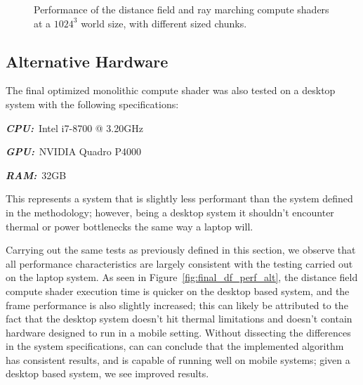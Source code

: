 \begin{figure}

    \caption{Performance of the distance field and ray marching compute shaders at a $1024^3$ world size, with
        different sized chunks.}
    \label{fig:final_df_perf}
\end{figure}

\subsection{Alternative Hardware}
The final optimized monolithic compute shader was also tested on a desktop system with the following specifications:

\begin{description}
    \item \textbf{\textit{CPU:}}~Intel i7-8700 @ 3.20GHz
    \item \textbf{\textit{GPU:}}~NVIDIA Quadro P4000
    \item \textbf{\textit{RAM:}}~32GB
\end{description}

This represents a system that is slightly less performant than the system defined in the methodology; however, being a
desktop system it shouldn't encounter thermal or power bottlenecks the same way a laptop will.

Carrying out the same tests as previously defined in this section, we observe that all performance characteristics
are largely consistent with the testing carried out on the laptop system. As seen in Figure~\ref{fig:final_df_perf_alt},
the distance field compute shader execution time is quicker on the desktop based system, and the frame performance is
also slightly increased; this can likely be attributed to the fact that the desktop system doesn't hit thermal limitations
and doesn't contain hardware designed to run in a mobile setting. Without dissecting the differences in the system
specifications, can can conclude that the implemented algorithm has consistent results, and is capable of running well
on mobile systems; given a desktop based system, we see improved results.

